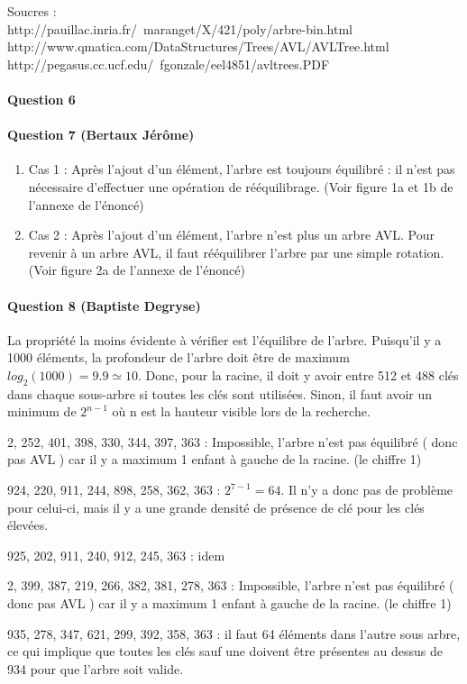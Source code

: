 \documentclass[a4paper]{article}
\begin{document}
{\footnotesize Soucres : \\
http://pauillac.inria.fr/~maranget/X/421/poly/arbre-bin.html\\
http://www.qmatica.com/DataStructures/Trees/AVL/AVLTree.html\\
http://pegasus.cc.ucf.edu/~fgonzale/eel4851/avltrees.PDF\\}

\paragraph*{Question 6}
\paragraph*{Question 7 (Bertaux Jérôme)}
\begin{enumerate}
\item Cas 1 :  Après l'ajout d'un élément, l'arbre est toujours équilibré : il n'est pas nécessaire d'effectuer une opération de rééquilibrage. (Voir figure 1a et 1b de l'annexe de l'énoncé)
\item Cas 2 : Après l'ajout d'un élément, l'arbre n'est plus un arbre AVL. Pour revenir à un arbre AVL, il faut rééquilibrer l'arbre par une simple rotation. (Voir figure 2a de l'annexe de l'énoncé)
\end{enumerate}

\paragraph*{Question 8 (Baptiste Degryse)}
La propriété la moins évidente à vérifier est l'équilibre de l'arbre. Puisqu'il y a 1000 éléments, la profondeur de l'arbre doit être de maximum $log_2(1000) = 9.9 \simeq 10 $. Donc, pour la racine, il doit y avoir entre 512 et 488 clés dans chaque sous-arbre si toutes les clés sont utilisées. Sinon, il faut avoir un minimum de $2^{n-1}$ où n est la hauteur visible lors de la recherche.

2, 252, 401, 398, 330, 344, 397, 363 : Impossible, l'arbre n'est pas équilibré ( donc pas AVL ) car il y a maximum 1 enfant à gauche de la racine. (le chiffre 1)

924, 220, 911, 244, 898, 258, 362, 363 : $2^{7-1} = 64$. Il n'y a donc pas de problème pour celui-ci, mais il y a une grande densité de présence de clé pour les clés élevées.

925, 202, 911, 240, 912, 245, 363 : idem

2, 399, 387, 219, 266, 382, 381, 278, 363 : Impossible, l'arbre n'est pas équilibré ( donc pas AVL ) car il y a maximum 1 enfant à gauche de la racine. (le chiffre 1)

935, 278, 347, 621, 299, 392, 358, 363 : il faut 64 éléments dans l'autre sous arbre, ce qui implique que toutes les clés sauf une doivent être présentes au dessus de 934 pour que l'arbre soit valide.
\end{document}
